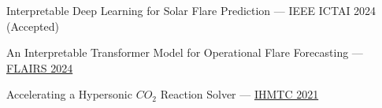 
\vspace{0.4em}

\begin{zetaremune}
    \item Interpretable Deep Learning for Solar Flare Prediction --- IEEE ICTAI 2024 (Accepted) %
    \item An Interpretable Transformer Model for Operational Flare Forecasting --- \href{https://journals.flvc.org/FLAIRS/article/view/135327}{FLAIRS 2024}
    \item Accelerating a Hypersonic $CO_2$ Reaction Solver --- \href{https://ishmtdigitallibrary.com/conferences/486d924a7e5ad8c3,393f7ffc7879d8ca,2aa0e4f13f8adbd7.html}{IHMTC 2021}
\end{zetaremune}

